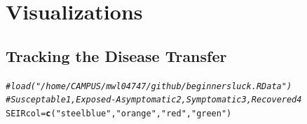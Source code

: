 \documentclass{article}\usepackage[]{graphicx}\usepackage[]{color}
\makeatletter
\newcommand{\hlstr}[1]{\textcolor[rgb]{0.192,0.494,0.8}{#1}}%
\newcommand{\hlcom}[1]{\textcolor[rgb]{0.678,0.584,0.686}{\textit{#1}}}%
\newcommand{\hlstd}[1]{\textcolor[rgb]{0.345,0.345,0.345}{#1}}%
\newcommand{\hlkwb}[1]{\textcolor[rgb]{0.69,0.353,0.396}{#1}}%
\newcommand{\hlkwd}[1]{\textcolor[rgb]{0.737,0.353,0.396}{\textbf{#1}}}%
\newenvironment{kframe}{%
 \def\at@end@of@kframe{}%
 \ifinner\ifhmode%
  \def\at@end@of@kframe{\end{minipage}}%
  \begin{minipage}{\columnwidth}%
 \fi\fi%
 \def\FrameCommand##1{\hskip\@totalleftmargin \hskip-\fboxsep
 \colorbox{shadecolor}{##1}\hskip-\fboxsep
     \hskip-\linewidth \hskip-\@totalleftmargin \hskip\columnwidth}%
 \MakeFramed {\advance\hsize-\width
   \@totalleftmargin\z@ \linewidth\hsize
   \@setminipage}}%
 {\par\unskip\endMakeFramed%
 \at@end@of@kframe}
\newenvironment{knitrout}{}{} %
\makeatother
\begin{document}
\section{Visualizations}

\subsection{Tracking the Disease Transfer}

\begin{knitrout}
\color{fgcolor}\begin{kframe}
\begin{alltt}
\hlcom{#load("/home/CAMPUS/mwl04747/github/beginnersluck.RData")}
\hlcom{# Susceptable 1, Exposed-Asymptomatic 2, Symptomatic 3, Recovered 4}
\hlstd{SEIRcol} \hlkwb{=} \hlkwd{c}\hlstd{(}\hlstr{"steelblue"}\hlstd{,} \hlstr{"orange"}\hlstd{,}\hlstr{"red"}\hlstd{,} \hlstr{"green"}\hlstd{)}


\end{alltt}
\end{kframe}
\end{knitrout}
\end{document}
